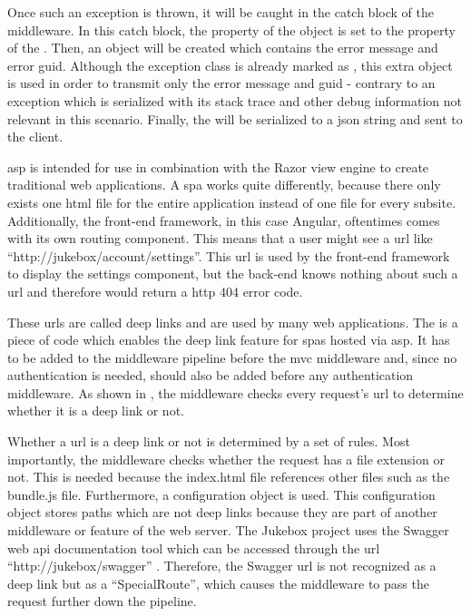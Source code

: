 Once such an exception is thrown, it will be caught in the catch block of the middleware. In this catch block, the  property of the  object is set to the  property of the . Then, an  object will be created which contains the error message and error \gls{guid}. Although the exception class is already marked as \lstcode{[Serializable]}, this extra object is used in order to transmit only the error message and \gls{guid} - contrary to an exception which is serialized with its stack trace and other debug information not relevant in this scenario. Finally, the  will be serialized to a \gls{json} string and sent to the client.





\gls{asp} is intended for use in combination with the Razor view engine to create traditional web applications. A \gls{spa} works quite differently, because there only exists one \gls{html} file for the entire application instead of one file for every subsite. Additionally, the front-end framework, in this case Angular, oftentimes comes with its own routing component. This means that a user might see a \gls{url} like \enquote{http://jukebox/account/settings}. This \gls{url} is used by the front-end framework to display the settings component, but the back-end knows nothing about such a \gls{url} and therefore would return a \gls{http} 404 error code.

These \glspl{url} are called deep links and are used by many web applications. The  is a piece of code which enables the deep link feature for \glspl{spa} hosted via \gls{asp}. It has to be added to the middleware pipeline before the \gls{mvc} middleware and, since no authentication is needed, should also be added before any authentication middleware. As shown in , the middleware checks every request's \gls{url} to determine whether it is a deep link or not.

Whether a \gls{url} is a deep link or not is determined by a set of rules. Most importantly, the middleware checks whether the request has a file extension or not. This is needed because the index.html file references other files such as the bundle.js file. Furthermore, a configuration object is used. This configuration object stores paths which are not deep links because they are part of another middleware or feature of the web server. The Jukebox project uses the Swagger web \gls{api} documentation tool which can be accessed through the \gls{url} \enquote{http://jukebox/swagger} \cite{swagger}. Therefore, the Swagger \gls{url} is not recognized as a deep link but as a \enquote{SpecialRoute}, which causes the middleware to pass the request further down the pipeline.

